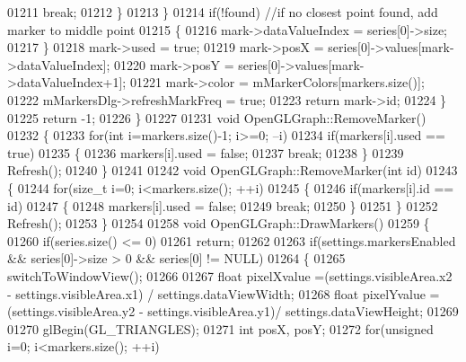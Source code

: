 \begin{DoxyCode}
{{{{{{{{{{01211                 \textcolor{keywordflow}{break};
01212             \}
01213         \}
01214         \textcolor{keywordflow}{if}(!found) \textcolor{comment}{//if no closest point found, add marker to middle point}
01215         \{
01216             mark->dataValueIndex = series[0]->size;
01217         \}
01218         mark->used = \textcolor{keyword}{true};
01219         mark->posX = series[0]->values[mark->dataValueIndex];
01220         mark->posY = series[0]->values[mark->dataValueIndex+1];
01221         mark->color = mMarkerColors[markers.size()];
01222         mMarkersDlg->refreshMarkFreq = \textcolor{keyword}{true};
01223         \textcolor{keywordflow}{return} mark->id;
01224     \}
01225     \textcolor{keywordflow}{return} -1;
01226 \}
01227 
01231 \textcolor{keywordtype}{void} OpenGLGraph::RemoveMarker()
01232 \{
01233     \textcolor{keywordflow}{for}(\textcolor{keywordtype}{int} i=markers.size()-1; i>=0; --i)
01234         \textcolor{keywordflow}{if}(markers[i].used == \textcolor{keyword}{true})
01235         \{
01236             markers[i].used = \textcolor{keyword}{false};
01237             \textcolor{keywordflow}{break};
01238         \}
01239     Refresh();
01240 \}
01241 
01242 \textcolor{keywordtype}{void} OpenGLGraph::RemoveMarker(\textcolor{keywordtype}{int} \textcolor{keywordtype}{id})
01243 \{
01244     \textcolor{keywordflow}{for}(\textcolor{keywordtype}{size\_t} i=0; i<markers.size(); ++i)
01245     \{
01246         \textcolor{keywordflow}{if}(markers[i].\textcolor{keywordtype}{id} == \textcolor{keywordtype}{id})
01247         \{
01248             markers[i].used = \textcolor{keyword}{false};
01249             \textcolor{keywordflow}{break};
01250         \}
01251     \}
01252     Refresh();
01253 \}
01254 
01258 \textcolor{keywordtype}{void} OpenGLGraph::DrawMarkers()
01259 \{
01260         \textcolor{keywordflow}{if}(series.size() <= 0)
01261             \textcolor{keywordflow}{return};
01262 
01263     \textcolor{keywordflow}{if}(settings.markersEnabled && series[0]->size > 0 && series[0] != NULL)
01264     \{
01265         switchToWindowView();
01266 
01267         \textcolor{keywordtype}{float} pixelXvalue =(settings.visibleArea.x2 - settings.visibleArea.x1) / 
      settings.dataViewWidth;
01268         \textcolor{keywordtype}{float} pixelYvalue = (settings.visibleArea.y2 - settings.visibleArea.y1)/  
      settings.dataViewHeight;
01269 
01270         glBegin(GL_TRIANGLES);
01271         \textcolor{keywordtype}{int} posX, posY;
01272         \textcolor{keywordflow}{for}(\textcolor{keywordtype}{unsigned} i=0; i<markers.size(); ++i)
}}}}}}}}}}
\end{DoxyCode}
